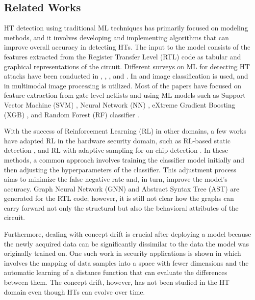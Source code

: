 \documentclass[9pt,conference]{IEEEtran}
\begin{document}
\subsection{Related Works}
\label{Related}
HT detection using traditional ML techniques has primarily focused on modeling methods, and it involves developing and implementing algorithms that can improve overall accuracy in detecting HTs. The input to the model consists of the features extracted from the Register Transfer Level (RTL) code as tabular and graphical representations of the circuit. Different surveys on ML for detecting HT attacks have been conducted in \cite{huang2020survey}, \cite{gubbi2023hardware}, \cite{koylu2023survey}, and \cite{kundu2021application}. In \cite{botero2021hardware} and \cite{ashok2022hardware} image classification is used, and in \cite{10027082} multimodal image processing is utilized. Most of the papers have focused on feature extraction from gate-level netlists and using ML models such as Support Vector Machine (SVM) \cite{bao2014application}, Neural Network (NN) \cite{hasegawa2017hardware}, eXtreme Gradient Boosting (XGB) \cite{dong2019machine}, and Random Forest (RF) classifier \cite{hasegawa2017trojan}.

With the success of Reinforcement Learning (RL) in other domains, a few works have adapted RL in the hardware security domain, such as RL-based static detection \cite{gohil2022attrition}, and RL with adaptive sampling for on-chip detection \cite{chen2023adatest}. In these methods, a common approach involves training the classifier model initially and then adjusting the hyperparameters of the classifier. This adjustment process aims to minimize the false negative rate and, in turn, improve the model's accuracy. Graph Neural Network (GNN) \cite{alrahis2022embracing,hepp2022golden} and Abstract Syntax Tree (AST) \cite{han2019hardware} are generated for the RTL code; however, it is still not clear how the graphs can carry forward not only the structural but also the behavioral attributes of the circuit.

Furthermore, dealing with concept drift is crucial after deploying a model because the newly acquired data can be significantly dissimilar to the data the model was originally trained on. One such work in security applications is shown in \cite{yang2021cade} which involves the mapping of data samples into a space with fewer dimensions and the automatic learning of a distance function that can evaluate the differences between them. The concept drift, however, has not been studied in the HT domain even though HTs can evolve over time.
\end{document}
